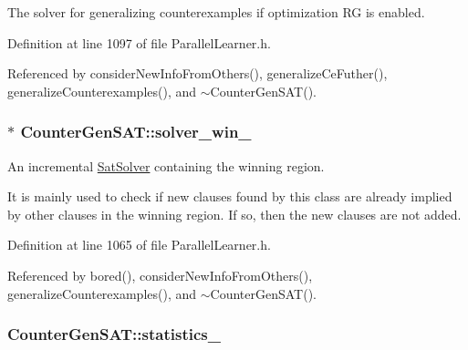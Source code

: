 The solver for generalizing counterexamples if optimization R\-G is enabled. 



Definition at line 1097 of file Parallel\-Learner.\-h.



Referenced by consider\-New\-Info\-From\-Others(), generalize\-Ce\-Futher(), generalize\-Counterexamples(), and $\sim$\-Counter\-Gen\-S\-A\-T().

\hypertarget{classCounterGenSAT_a4c209741406375df9ba19b830ca4d6f9}{
\subsubsection[{solver\-\_\-win\-\_\-}]{$\ast$ Counter\-Gen\-S\-A\-T\-::solver\-\_\-win\-\_\-\hspace{0.3cm}{\ttfamily [protected]}}}\label{classCounterGenSAT_a4c209741406375df9ba19b830ca4d6f9}


An incremental \hyperlink{classSatSolver}{Sat\-Solver} containing the winning region. 

It is mainly used to check if new clauses found by this class are already implied by other clauses in the winning region. If so, then the new clauses are not added. 

Definition at line 1065 of file Parallel\-Learner.\-h.



Referenced by bored(), consider\-New\-Info\-From\-Others(), generalize\-Counterexamples(), and $\sim$\-Counter\-Gen\-S\-A\-T().

\hypertarget{classCounterGenSAT_a0e7c47014a35bac7a6de0a61ee8d2c22}{
\subsubsection[{statistics\-\_\-}]{ Counter\-Gen\-S\-A\-T\-::statistics\-\_\-\hspace{0.3cm}{\ttfamily [protected]}}}\label{classCounterGenSAT_a0e7c47014a35bac7a6de0a61ee8d2c22}


